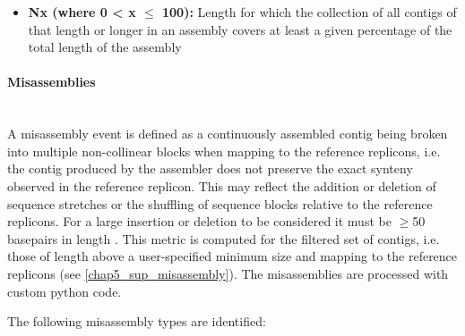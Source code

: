 \begin{itemize}
    \item \textbf{Nx (where 0  < x  $\leq$ 100):} Length for which the collection of all contigs of that length or longer in an assembly covers at least a given percentage of the total length of the assembly
\end{itemize}

\paragraph{Misassemblies} \mbox{}\\

A misassembly event is defined as a continuously assembled contig being broken into multiple non-collinear blocks when mapping to the reference replicons, i.e. the contig produced by the assembler does not preserve the exact synteny observed in the reference replicon. This may reflect the addition or deletion of sequence stretches or the shuffling of sequence blocks relative to the reference replicons. For a large insertion or deletion to be considered it must be $\geq $50 basepairs in length \cite{kosugi_comprehensive_2019}. This metric is computed for the filtered set of contigs, i.e. those of length above a user-specified minimum size and mapping to the reference replicons (see \ref{chap5_sup_misassembly}). The misassemblies are processed with custom python code. 

The following misassembly types are identified:

